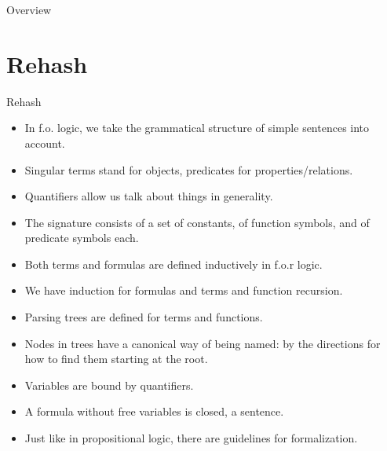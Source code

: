 \setcounter{framenumber}{264}
\begin{frame}
	\maketitle
\end{frame}

\begin{frame}{Overview}
\tableofcontents
\end{frame}

\section{Rehash}
\begin{frame}{Rehash}
	
\begin{itemize}
	
		\item In f.o. logic, we take the grammatical structure of simple sentences into account.
		
		\item  \alert{Singular terms stand for objects, predicates for properties/relations.}
		
		\item \alert{Quantifiers allow us talk about things in generality.}
		
		\item \alert{The signature consists of a set of constants, of function symbols, and of predicate symbols each.}
		
		\item Both terms and formulas are defined inductively in f.o.r logic.
		
		\item \alert{We have induction for formulas and terms and function recursion.}
		
		\item Parsing trees are defined for terms and functions.
		
		\item Nodes in trees have a canonical way of being named: by the directions for how to find them starting at the root. 
		
		\item \alert{Variables are bound by quantifiers.}
		
		\item \alert{A formula without free variables is closed, a sentence.}
		
		\item Just like in propositional logic, there are guidelines for formalization.
					
	\end{itemize}

\end{frame}
		

